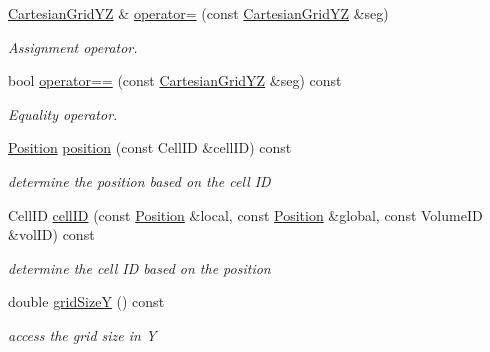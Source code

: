 \begin{DoxyCompactItemize}
\hyperlink{class_d_d4hep_1_1_geometry_1_1_cartesian_grid_y_z}{CartesianGridYZ} \& \hyperlink{class_d_d4hep_1_1_geometry_1_1_cartesian_grid_y_z_a5b597a85e6916bf6f4a61123d6bfada3}{operator=} (const \hyperlink{class_d_d4hep_1_1_geometry_1_1_cartesian_grid_y_z}{CartesianGridYZ} \&seg)
\begin{DoxyCompactList}\small\item\em Assignment operator. \item\end{DoxyCompactList}\item 
bool \hyperlink{class_d_d4hep_1_1_geometry_1_1_cartesian_grid_y_z_a31f625c0056287ae2d993317ed3c661e}{operator==} (const \hyperlink{class_d_d4hep_1_1_geometry_1_1_cartesian_grid_y_z}{CartesianGridYZ} \&seg) const 
\begin{DoxyCompactList}\small\item\em Equality operator. \item\end{DoxyCompactList}\item 
\hyperlink{namespace_d_d4hep_1_1_geometry_a55083902099d03506c6db01b80404900}{Position} \hyperlink{class_d_d4hep_1_1_geometry_1_1_cartesian_grid_y_z_ab29bceeb4c0988d679a615f1d7c4fb6c}{position} (const CellID \&cellID) const 
\begin{DoxyCompactList}\small\item\em determine the position based on the cell ID \item\end{DoxyCompactList}\item 
CellID \hyperlink{class_d_d4hep_1_1_geometry_1_1_cartesian_grid_y_z_a8b1add0a770a1822d31a7bec12748cf5}{cellID} (const \hyperlink{namespace_d_d4hep_1_1_geometry_a55083902099d03506c6db01b80404900}{Position} \&local, const \hyperlink{namespace_d_d4hep_1_1_geometry_a55083902099d03506c6db01b80404900}{Position} \&global, const VolumeID \&volID) const 
\begin{DoxyCompactList}\small\item\em determine the cell ID based on the position \item\end{DoxyCompactList}\item 
double \hyperlink{class_d_d4hep_1_1_geometry_1_1_cartesian_grid_y_z_aa682499731e5b3c658a3c0b363040eac}{gridSizeY} () const 
\begin{DoxyCompactList}\small\item\em access the grid size in Y \item\end{DoxyCompactList}\item 

\end{DoxyCompactItemize}
